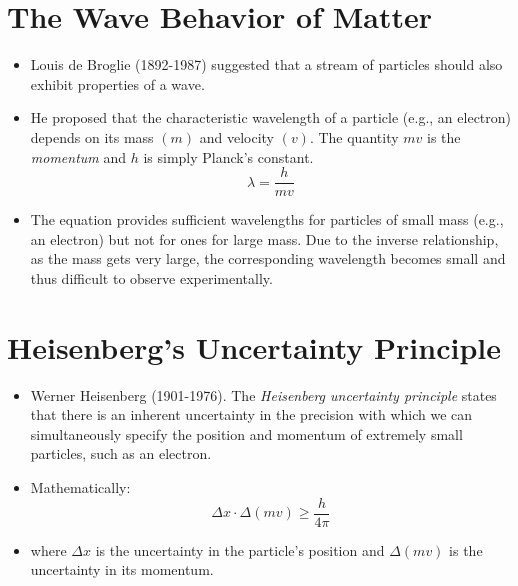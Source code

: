 \documentclass[
	chapter=7,
	title={Quantum Theory {\&} the Electronic Structure of Atoms},
	showanswers=true,
]{chem122notes}
\begin{document}
\section{The Wave Behavior of Matter}\label{sec:the-wave-behavior-of-matter}
\begin{itemize}
	\item Louis de Broglie (1892-1987) suggested that a stream of particles should also exhibit properties of a wave.
	\item He proposed that the characteristic wavelength of a particle (e.g., an electron) depends on its mass $(m)$ and velocity $(v)$.
	The quantity $mv$ is the \emph{momentum} and $h$ is simply Planck's constant.
	\begin{equation}
		\lambda = \frac{h}{mv}
		\label{eq:wave-behavior-of-matter}
	\end{equation}
	\item The equation provides sufficient wavelengths for particles of small mass (e.g., an electron) but not for ones for large mass.
	Due to the inverse relationship, as the mass gets very large, the corresponding wavelength becomes small and thus difficult to observe experimentally.
\end{itemize}

\section{Heisenberg's Uncertainty Principle}\label{sec:heisenberg's-uncertainty-principle}
\begin{itemize}
	\item Werner Heisenberg (1901-1976).
	The \emph{Heisenberg uncertainty principle} states that there is an inherent uncertainty in the precision with which we can simultaneously specify the position and momentum of extremely small particles, such as an electron.
	\item Mathematically:
	\begin{equation}
		\Delta x \cdot \Delta (mv) \geq \frac{h}{4\pi}
		\label{eq:heisenberg-uncertainty-principle}
	\end{equation}
	\item where $\Delta x$ is the uncertainty in the particle's position and $\Delta (mv)$ is the uncertainty in its momentum.
\end{itemize}
\end{document}
